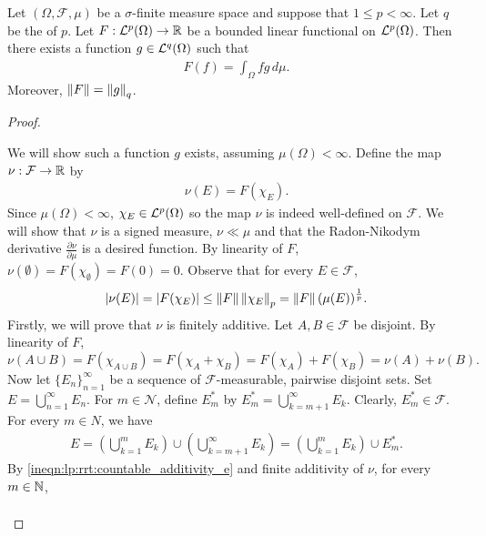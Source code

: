 \begin{theorem}
\label{thm:lp:rrt}
Let $(\Omega, \mathcal{F}, \mu)$ be a $\sigma$-finite measure space and suppose that $1 \leq p < \infty$.
Let $q$ be the  of $p$. Let $F : {\mathcal {L}^p}(\Omega) \to {\mathbb R}$ be a bounded linear functional on ${\mathcal {L}^p}(\Omega)$. Then there exists a function $g \in {\mathcal {L}^q}(\Omega)$ such that
\begin{align}
    \label{eqn:lp:claim_riesz}
    F (f) = \int_\Omega f g \,d\mu.
\end{align}
Moreover, $\left\lVert F\right\rVert = \left\lVert g\right\rVert_q$.
\end{theorem}
\begin{proof}
\setcounter{step}{0}
\begin{step}[$\mu(\Omega) < \infty$]
We will show such a function $g$ exists, assuming $\mu(\Omega) < \infty$. Define the map $\nu : \mathcal{F} \to {\mathbb R}$ by
\begin{align*}
    \nu(E) = F (\chi_E).
\end{align*}
Since $\mu(\Omega) < \infty$, $\chi_E \in {\mathcal {L}^p}(\Omega)$ so the map $\nu$ is indeed well-defined on $\mathcal{F}$. We will show that $\nu$ is a signed measure, $\nu \ll \mu$ and that the Radon-Nikodym derivative $\frac{\partial \nu}{\partial \mu}$ is a desired function. By linearity of $F$, $\nu(\emptyset) = F(\chi_\emptyset) = F(0) = 0$. Observe that for every $E \in \mathcal{F}$, \begin{align}
    \label{ineqn:lp:rrt:abs-nu-mu}
    | \nu(E) | = | F(\chi_E) | \leq \left\lVert F\right\rVert \left\lVert\chi_E\right\rVert_p = \left\lVert F\right\rVert (\mu(E))^{\frac{1}{p}}.
\end{align}
Firstly, we will prove that $\nu$ is finitely additive. Let $A, B \in \mathcal{F}$ be disjoint. By linearity of $F$, \[
    \nu(A \cup B) = F(\chi_{A \cup B}) = F(\chi_{A} + \chi_{B}) = F(\chi_A) + F(\chi_B) = \nu(A) + \nu(B).
\]
Now let $\{ E_n \}_{n=1}^{\infty}$ be a sequence of $\mathcal{F}$-measurable, pairwise disjoint sets. Set $E = \bigcup_{n = 1}^{\infty} E_n$. For $m \in \mathcal{N}$, define $E_{m}^\ast$ by $E_{m}^\ast = \bigcup_{k = m + 1}^\infty E_k$. Clearly, $E_{m}^\ast \in \mathcal{F}$. For every $m \in N$, we have \begin{align}
     \label{ineqn:lp:rrt:countable_additivity_e}
    E = \left (\bigcup_{k = 1}^m E_k \right) \cup \left ( \bigcup_{k = m + 1}^\infty E_k \right) = \left(\bigcup_{k=1}^m E_k \right) \cup E_{m}^\ast.
\end{align}
By \ref{ineqn:lp:rrt:countable_additivity_e} and finite additivity of $\nu$, for every $m \in {\mathbb N}$, \begin{align}

\end{align}
\end{step}
\end{proof}
